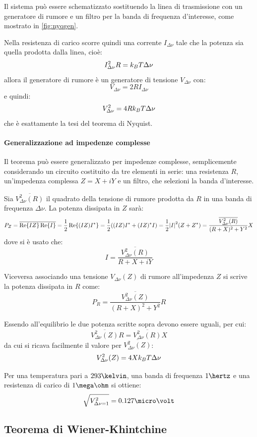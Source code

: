 Il sistema può essere schematizzato sostituendo la linea di trasmissione con un generatore di rumore e un filtro per la banda di frequenza d'interesse, come mostrato in \cref{fig:nyqgen}.

Nella resistenza di carico scorre quindi una corrente $ I_{\Delta\nu} $ tale che la potenza sia quella prodotta dalla linea, cioè:
\[ I_{\Delta\nu}^2 R = k_B T \Delta\nu \]
allora il generatore di rumore è un generatore di tensione $ V_{\Delta\nu} $ con:
\[ V_{\Delta\nu} = 2 R I_{\Delta\nu} \]
e quindi:
\[ V_{\Delta\nu}^2 = 4 R k_B T \Delta\nu \]
che è esattamente la tesi del teorema di Nyquist.

\paragraph{Generalizzazione ad impedenze complesse} Il teorema può essere generalizzato per impedenze complesse, semplicemente considerando un circuito costituito da tre elementi in serie: una resistenza $ R $, un'impedenza complessa $ Z = X + i Y $ e un filtro, che selezioni la banda d'interesse.

Sia $ \overline{V_{\Delta\nu}^2(R)} $ il quadrato della tensione di rumore prodotta da $ R $ in una banda di frequenza $ \Delta\nu $. La potenza dissipata in $ Z $ sarà:
\[ P_Z = \overline{\Re\{IZ\} \Re\{I\}} = \frac{1}{2} \Re\{(IZ) I^\ast\} = \frac{1}{2} ((IZ) I^\ast + (IZ)^\ast I) = \frac{1}{2}\abs{I}^2 (Z + Z^\ast) = \frac{\overline{V_{\Delta\nu}^2(R)}}{(R+X)^2 + Y^2}X\]
dove si è usato che:
\[ I = \frac{\overline{V_{\Delta\nu}^2(R)}}{R + X +iY} \]

Viceversa associando una tensione $ V_{\Delta\nu}(Z) $ di rumore all'impedenza $ Z $ si scrive la potenza dissipata in $ R $ come:
\[  P_R = \frac{\overline{V_{\Delta\nu}^2(Z)}}{(R+X)^2 + Y^2}R \]

Essendo all'equilibrio le due potenza scritte sopra devono essere uguali, per cui:
\[ \overline{V_{\Delta\nu}^2(Z)} R = \overline{V_{\Delta\nu}^2(R)} X \]
da cui si ricava facilmente il valore per $ \overline{V_{\Delta\nu}^2(Z)} $:
\[ V_{\Delta\nu}^2(Z) = 4 X k_B T \Delta\nu\]

\begin{es}
	Per una temperatura pari a $ 293 \kelvin $, una banda di frequenza $ 1 \hertz $ e una resistenza di carico di $ 1 \mega\ohm $ si ottiene:
	\[ \sqrt{V_{\Delta\nu = 1}^2} = 0.127 \micro\volt \]
\end{es}

\subsection{Teorema di Wiener-Khintchine}
\label{sec:fluctdiss}

